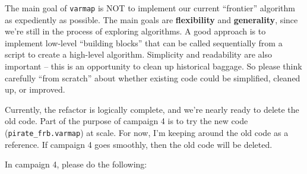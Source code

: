\documentclass{article}
\numberwithin{equation}{section}   %
\begin{document}
The main goal of \verb|varmap| is NOT to implement our current ``frontier'' algorithm as expediently as possible. 
The main goals are {\bf flexibility} and {\bf generality}, since we're still in the process of 
exploring algorithms. A good approach is to implement low-level ``building blocks'' that can be 
called sequentially from a script to create a high-level algorithm. Simplicity and readability 
are also important -- this is an opportunity to clean up historical baggage. 
So please think carefully ``from scratch'' about whether existing code could be simplified, cleaned up, or improved.

Currently, the refactor is logically complete, and we're nearly ready to
delete the old code.
Part of the purpose of campaign 4 is to try the new code (\verb|pirate_frb.varmap|)
at scale.
For now, I'm keeping around the old code as a reference.
If campaign 4 goes smoothly, then the old code will be deleted.

\par\noindent
In campaign 4, please do the following:
\end{document}
